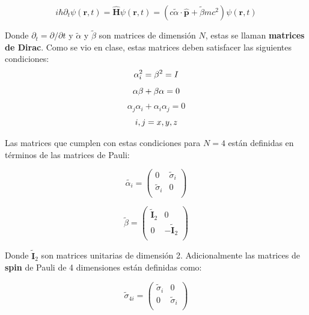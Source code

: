 \documentclass[a4paper, 12pt]{article} %
\begin{document}
\begin{equation}\label{dirac}
i\hbar \partial_t \psi(\mathbf{r},t) = \hat{\mathbf{H}}\psi(\mathbf{r},t) =
(c\widetilde{\alpha}\cdot \hat{\mathbf{p}} + \widetilde{\beta}mc^2)\psi(\mathbf{r},t)
\end{equation}

Donde $\partial_t = \partial / \partial t$ y $\widetilde{\alpha}$ y $\widetilde{\beta}$ son matrices de dimensi\'on $N$, 
estas se llaman \textbf{matrices de Dirac}.
Como se vio en clase, estas matrices deben satisfacer las siguientes condiciones:\\

\[
\alpha_i^2 = \beta^2 = I \\
\]
\[
\alpha \beta + \beta \alpha = 0 \\
\]
\[
\alpha_j \alpha_i + \alpha_i \alpha_j = 0
\]
\[
i,j=x, y, z\\
\] 

Las matrices que cumplen con estas condiciones para $N=4$ est\'an definidas en t\'erminos
de las matrices de Pauli:

\begin{equation}
\widetilde{\alpha_i}=
\begin{pmatrix}
0 & \widetilde{\sigma}_i\\
\widetilde{\sigma}_i & 0 \\
\end{pmatrix}
\end{equation}

\begin{equation}
\widetilde{\beta}=
\begin{pmatrix}
\widetilde{\mathbf{I}}_2 & 0\\
0 & -\widetilde{\mathbf{I}}_2 \\
\end{pmatrix}
\end{equation}

Donde $\widetilde{\mathbf{I}}_2$ son matrices unitarias de dimensi\'on 2. 
Adicionalmente las matrices de \textbf{spin} de Pauli de 4 dimensiones
est\'an definidas como:

\begin{equation}
\widetilde{\sigma}_{4i}=
\begin{pmatrix}
\widetilde{\sigma}_i & 0 \\
0 & \widetilde{\sigma}_i  \\
\end{pmatrix}
\end{equation}
\end{document}
